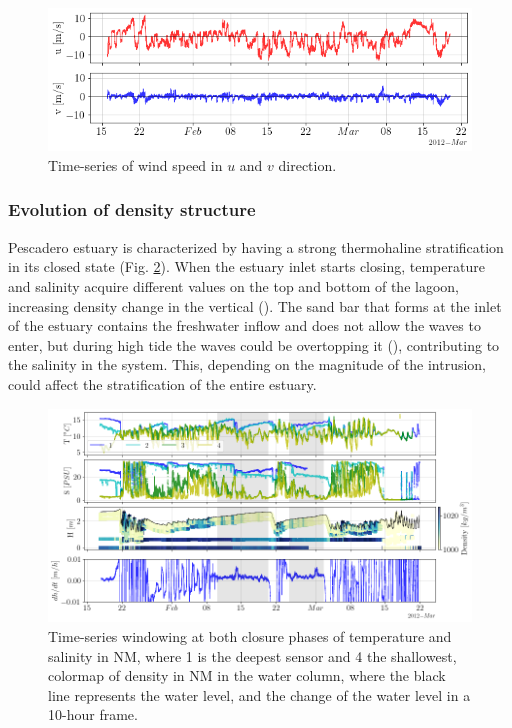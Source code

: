 \documentclass[tesis.tex]{subfiles}
\begin{document}
\begin{figure}[h!]
    \centering
    \includegraphics[width=\textwidth]{Imagenes/wind_vel.png}
    \caption{Time-series of wind speed in $u$ and $v$ direction.}
    \label{fig:windvel}
\end{figure}

\subsubsection{Evolution of density structure}

Pescadero estuary is characterized by having a strong thermohaline stratification in its closed state (Fig. \ref{fig:saltemp}). When the estuary inlet starts closing, temperature and salinity acquire different values on the top and bottom of the lagoon, increasing density change in the vertical (\cite{largier2015}). The sand bar that forms at the inlet of the estuary contains the freshwater inflow and does not allow the waves to enter, but during high tide the waves could be overtopping it (\cite{laudier2011measured}), contributing to the salinity in the system. This, depending on the magnitude of the intrusion, could affect the stratification of the entire estuary.\\

\begin{figure}[h!]
    \centering
    \includegraphics[scale=0.5]{Imagenes/saltemp.png}
    \caption{Time-series windowing at both closure phases of temperature and salinity in NM, where 1 is the deepest sensor and 4 the shallowest, colormap of density in NM in the water column, where the black line represents the water level, and the change of the water level in a 10-hour frame.}
    \label{fig:saltemp}
\end{figure}
\end{document}
